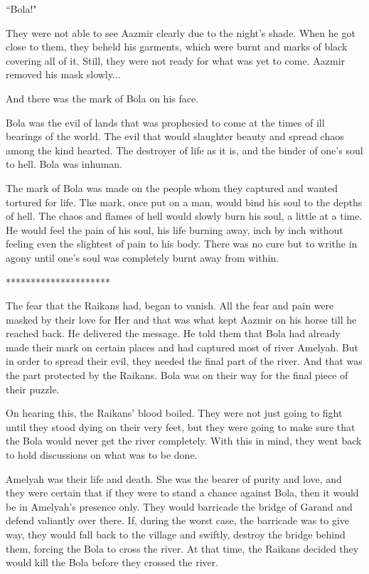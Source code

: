 \documentclass[twoside,11pt,titlepage]{article}
\begin{document}
``Bola!"

They were not able to see Aazmir clearly due to the night's shade. When he got close to them, they beheld his garments, which were burnt and marks of black covering all of it. Still, they were not ready for what was yet to come. Aazmir removed his mask slowly...

And there was the mark of Bola on his face.

Bola was the evil of lands that was prophesied to come at the times of ill bearings of the world. The evil that would slaughter beauty and spread chaos among the kind hearted. The destroyer of life as it is, and the binder of one's soul to hell. Bola was inhuman.

The mark of Bola was made on the people whom they captured and wanted tortured for life. The mark, once put on a man, would bind his soul to the depths of hell. The chaos and flames of hell would slowly burn his soul, a little at a time. He would feel the pain of his soul, his life burning away, inch by inch without feeling even the slightest of pain to his body. There was no cure but to writhe in agony until one's soul was completely burnt away from within.

\bigskip
\begin{center}
*********************
\end{center}

The fear that the Raikans had, began to vanish. All the fear and pain were masked by their love for Her and that was what kept Aazmir on his horse till he reached back. He delivered the message. He told them that Bola had already made their mark on certain places and had captured most of river Amelyah. But in order to spread their evil, they needed the final part of the river. And that was the part protected by the Raikans. Bola was on their way for the final piece of their puzzle.

On hearing this, the Raikans’ blood boiled. They were not just going to fight until they stood dying on their very feet, but they were going to make sure that the Bola would never get the river completely. With this in mind, they went back to hold discussions on what was to be done.

Amelyah was their life and death. She was the bearer of purity and love, and they were certain that if they were to stand a chance against Bola, then it would be in Amelyah’s presence only. They would barricade the bridge of Garand and defend valiantly over there. If, during the worst case, the barricade was to give way, they would fall back to the village and swiftly, destroy the bridge behind them, forcing the Bola to cross the river. At that time, the Raikans decided they would kill the Bola before they crossed the river.
\end{document}
